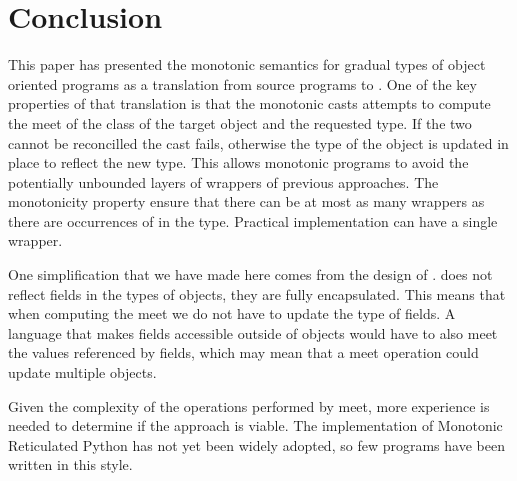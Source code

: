 \documentclass[sigconf]{acmart}
\begin{document}
\footnotesize
\normalsize

\section{Conclusion}

This paper has presented the monotonic semantics for gradual types of object
oriented programs as a translation from source programs to \kafka.  One of
the key properties of that translation is that the monotonic casts attempts
to compute the meet of the class of the target object and the requested
type.  If the two cannot be reconcilled the cast fails, otherwise the type
of the object is updated in place to reflect the new type. This allows
monotonic programs to avoid the potentially unbounded layers of wrappers of
previous approaches. The monotonicity property ensure that there can be at
most as many wrappers as there are occurrences of \any in the
type. Practical implementation can have a single wrapper.

One simplification that we have made here comes from the design of
\kafka. \kafka does not reflect fields in the types of objects, they are
fully encapsulated.  This means that when computing the meet we do not have
to update the type of fields. A language that makes fields accessible
outside of objects would have to also meet the values referenced by fields,
which may mean that a meet operation could update multiple objects.

Given the complexity of the operations performed by meet, more experience is
needed to determine if the approach is viable. The implementation of
Monotonic Reticulated Python has not yet been widely adopted, so few programs 
have been written in this style.



\end{document}
